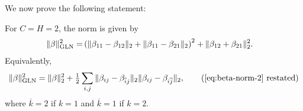 \documentclass{article}
\theoremstyle{plain}
\theoremstyle{definition}
\theoremstyle{remark}
\begin{document}
We now prove the following statement:

\begin{proposition}
For $C=H=2$, the norm is given by
\begin{align}
\begin{aligned}
\label{eq:beta-norm-3}
    \|\beta\|_{\rm GLN}^2=&\left(\|\beta_{11}-\beta_{12}\|_2+\|\beta_{11}-\beta_{21}\|_2\right)^2+\|\beta_{12}+\beta_{21}\|_2^2.
\end{aligned}
\end{align}
Equivalently,
\begin{equation}
    \|\beta\|_{\rm GLN}^2=\|\beta\|_2^2+\tfrac12\sum_{i,j}\|\beta_{ij}-\beta_{\overline{i}j}\|_2\|\beta_{ij}-\beta_{i\overline{j}}\|_2,
\tag{\ref{eq:beta-norm-2} restated}
\end{equation}
where $\overline{k}=2$ if $k=1$ and $\overline{k}=1$ if $k=2$.
\end{proposition}
\end{document}
